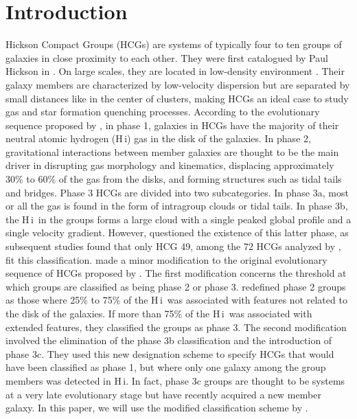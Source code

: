 \documentclass{aa}
\newcommand{\HI}{H\,{\sc i}}
\begin{document}
\section{Introduction}
Hickson Compact Groups (HCGs) are systems of typically four to ten groups of galaxies in close proximity to each other. 
They were first catalogued by Paul Hickson in \citeyear{1982ApJ...255..382H}. On large scales, they are located in low-density environment \citep{1995AJ....109.1476P}. 
Their galaxy members are characterized by low-velocity dispersion \citep[$\mathrm{\sim 200~km~s^{-1}},$][]{1992ApJ...399..353H} but are separated by small distances like in the center of clusters, making HCGs an ideal case to study gas and star formation quenching processes. According to the evolutionary sequence proposed by \citet{2001A&A...377..812V}, 
in phase 1, galaxies in HCGs have the majority of their neutral atomic hydrogen (\HI) gas in the disk of the galaxies. 
In phase 2, gravitational interactions between member galaxies are thought to be the main driver in  disrupting gas morphology and kinematics, displacing approximately 30\% to 60\% of the gas from the disks, and forming structures such as tidal tails and bridges. Phase 3 HCGs are divided into two subcategories. In phase 3a, most or all the gas is found in the form of intragroup clouds or tidal tails. In phase 3b, the \HI\ in the groups forms a large 
cloud with a single peaked global profile and a single velocity gradient. However, \citet{2023A&A...670A..21J} questioned the existence of this latter phase, 
as subsequent studies found that only HCG 49, among the 72 HCGs analyzed by \citet{2001A&A...377..812V}, fit this classification.  
\citet{2023A&A...670A..21J} made a minor modification to the original evolutionary sequence of HCGs proposed by \citet{2001A&A...377..812V}. 
The first modification concerns the threshold at which groups are classified as being phase 2 or phase 3. \citet{2023A&A...670A..21J} 
redefined phase 2 groups as those where 25\% to 75\% of the \HI\ was associated with features not related to the disk of the galaxies. 
If more than 75\% of the \HI\ was associated with extended features, they classified the groups as phase 3. The second modification involved 
the elimination of the phase 3b classification and the introduction of phase 3c. They used this new designation scheme to specify HCGs that 
would have been classified as phase 1, but where only one galaxy among the group members was detected in \HI. In fact, phase 3c groups are thought to be systems at a 
very late evolutionary stage but have recently acquired a new member galaxy. In this paper, we will use the modified classification 
scheme by \citet{2023A&A...670A..21J}. \\
\end{document}
